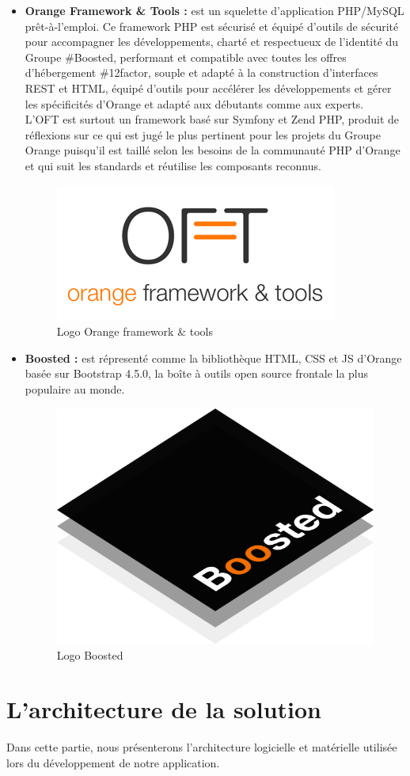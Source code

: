 \begin{itemize}
	\item \textbf{Orange Framework \& Tools\cite{oft} :} est un squelette d'application PHP/MySQL prêt-à-l'emploi. Ce framework PHP est sécurisé et équipé d'outils de sécurité pour accompagner les développements, charté et respectueux de l'identité du Groupe \#Boosted, performant et compatible avec toutes les offres d'hébergement \#12factor, souple et adapté à la construction d'interfaces REST et HTML, équipé d'outils pour accélérer les développements et gérer les spécificités d'Orange et adapté aux débutants comme aux experts.\\
	L'OFT est surtout un framework basé sur Symfony et Zend PHP, produit de réflexions sur ce qui est jugé le plus pertinent pour les projets du Groupe Orange puisqu'il est taillé selon les besoins de la communauté PHP d'Orange et qui suit les standards et réutilise les composants reconnus.
	\begin{figure}[H]
		\centering
		\includegraphics[width=0.3\linewidth]{img/logos/oft}
		\caption{Logo Orange framework \& tools}
		\label{fig:oft}
	\end{figure}
	
	
	\item \textbf{Boosted\cite{boosted} :} est répresenté comme la bibliothèque HTML, CSS et JS d'Orange basée sur Bootstrap 4.5.0, la boîte à outils open source frontale la plus populaire au monde.
	\begin{figure}[H]
		\centering
		\includegraphics[width=0.2\linewidth]{img/logos/boosted}
		\caption[Logo Boosted]{Logo Boosted}
		\label{fig:boosted}
	\end{figure}
\end{itemize}

\section[L'architecture de la solution]{L'architecture de la solution}
Dans cette partie, nous présenterons l'architecture logicielle et matérielle utilisée lors du développement de notre application.
